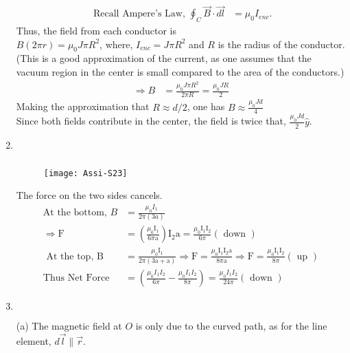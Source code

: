 \begin{enumerate}
	\begin{answer}
		\begin{align*}
		\text{ Recall Ampere's Law, }\oint_{C} \vec{B} \cdot \overrightarrow{d l}&=\mu_{0} I_{e n c}.
		\end{align*}
			Thus, the field from each conductor is\\
		$B(2 \pi r)=\mu_{0} J \pi R^{2}$, where, $I_{e n c}=J \pi R^{2}$ and $R$ is the radius of the conductor.\\
		(This is a good approximation of the current, as one assumes that the vacuum region in the center is small compared to the area of the conductors.)
		\begin{align*}
		\Rightarrow B&=\frac{\mu_{0} J \pi R^{2}}{2 \pi R}=\frac{\mu_{0} J R}{2}
		\end{align*}
			Making the approximation that $R \approx d / 2$, one has $B \approx \frac{\mu_{0} J d}{4}$\\
		Since both fields contribute in the center, the field is twice that, $\frac{\mu_{0} J d}{2} \hat{y}$.
	\end{answer}
	\item $\left. \right. $
	\begin{answer}
			$\left. \right. $
		\begin{figure}[H]
			\centering
			\texttt{[image: Assi-S23]}
		\end{figure}
		The force on the two sides cancels.
		\begin{align*}
		\text{At the bottom, }B&=\frac{\mu_{0} I_{1}}{2 \pi(3 a)}\\
		\Rightarrow \mathrm{F}&=\left(\frac{\mu_{0} \mathrm{I}_{1}}{6 \pi \mathrm{a}}\right) \mathrm{I}_{2} \mathrm{a}=\frac{\mu_{0} \mathrm{I}_{1} \mathrm{I}_{2}}{6 \pi}(\text { down })\\
	\text{	At the top, }\mathrm{B}&=\frac{\mu_{0} \mathrm{I}_{1}}{2 \pi(3 \mathrm{a}+\mathrm{a})} \Rightarrow \mathrm{F}=\frac{\mu_{0} \mathrm{I}_{1} \mathrm{I}_{2} \mathrm{a}}{8 \pi \mathrm{a}} \Rightarrow \mathrm{F}=\frac{\mu_{0} \mathrm{I}_{1} \mathrm{I}_{2}}{8 \pi}(\text{ up })\\
	 \text{Thus Net Force }&=\left(\frac{\mu_{0} I_{1} I_{2}}{6 \pi}-\frac{\mu_{0} I_{1} I_{2}}{8 \pi}\right)=\frac{\mu_{0} I_{1} I_{2}}{24 \pi}(\text{ down })
		\end{align*}
	\end{answer}
	\item $\left. \right. $
	\begin{answer}
			 (a) The magnetic field at $O$ is only due to the curved path, as for the line element, $d \vec{l} \| \vec{r}$.

\end{answer}
\end{enumerate}
